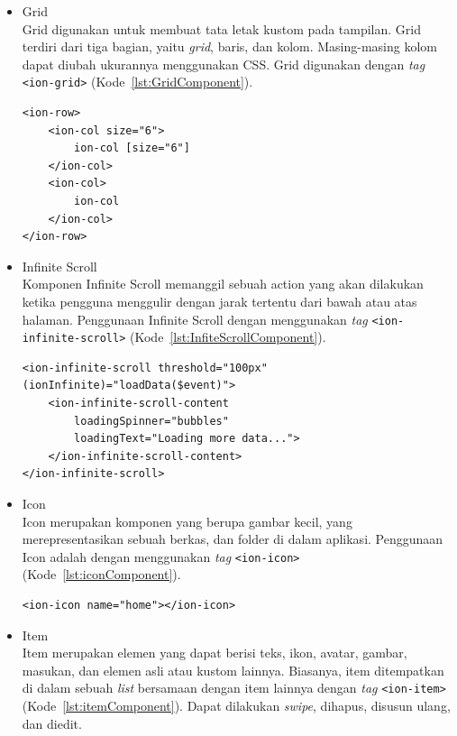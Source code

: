 \begin{itemize}
	\item Grid \\
	Grid digunakan untuk membuat tata letak kustom pada tampilan. Grid terdiri dari tiga bagian, yaitu \textit{grid}, baris, dan kolom. Masing-masing kolom dapat diubah ukurannya menggunakan CSS. Grid digunakan dengan \textit{tag} \texttt{<ion-grid>} (Kode~\ref{lst:GridComponent}).	

\begin{lstlisting}[label={lst:GridComponent}, caption=Potongan Kode Program dari Grid Component]
<ion-row>
	<ion-col size="6">
    	ion-col [size="6"]
    </ion-col>
    <ion-col>
      	ion-col
    </ion-col>
</ion-row>
\end{lstlisting}

	\item Infinite Scroll	\\
	Komponen Infinite Scroll memanggil sebuah action yang akan dilakukan ketika pengguna menggulir dengan jarak tertentu dari bawah atau atas halaman. Penggunaan Infinite Scroll dengan menggunakan {\it tag} \texttt{<ion-infinite-scroll>} (Kode~\ref{lst:InfiteScrollComponent}). 
	
\begin{lstlisting}[label={lst:InfiteScrollComponent}, caption=Potongan Kode Program dari Infinite Scroll Component]
<ion-infinite-scroll threshold="100px" (ionInfinite)="loadData($event)">
	<ion-infinite-scroll-content
		loadingSpinner="bubbles"
		loadingText="Loading more data...">
	</ion-infinite-scroll-content>
</ion-infinite-scroll>
\end{lstlisting}
	
	\item Icon \\
	Icon merupakan komponen yang berupa gambar kecil, yang merepresentasikan sebuah berkas, dan folder di dalam aplikasi. Penggunaan Icon adalah dengan menggunakan {\it tag} \texttt{<ion-icon>} (Kode~\ref{lst:iconComponent}).
\begin{lstlisting}[label={lst:iconComponent}, caption=Potongan Kode Program dari Icon Home]
<ion-icon name="home"></ion-icon>
\end{lstlisting} 
	\item Item \\
	Item merupakan elemen yang dapat berisi teks, ikon, avatar, gambar, masukan, dan elemen asli atau kustom lainnya. Biasanya, item ditempatkan di dalam sebuah {\it list} bersamaan dengan item lainnya dengan {\it tag} \texttt{<ion-item>} (Kode~\ref{lst:itemComponent}). Dapat dilakukan {\it swipe}, dihapus, disusun ulang, dan diedit.
	

\end{itemize}
